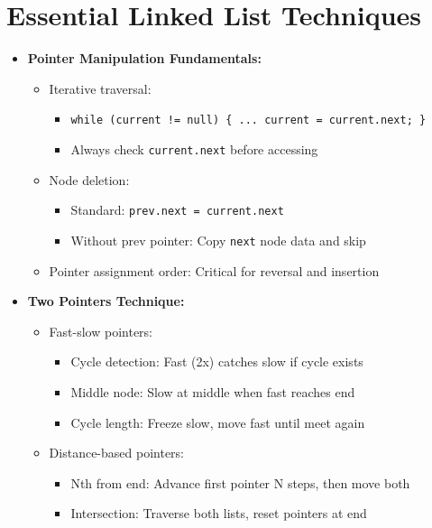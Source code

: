 \documentclass[a4paper,10pt]{book}
\begin{document}
\chapter{Essential Linked List Techniques }
\label{sec:linked}
\begin{itemize}
    \item \textbf{Pointer Manipulation Fundamentals:}
    \begin{itemize}
        \item Iterative traversal: 
        \begin{itemize}
            \item \texttt{while (current != null) \{ ... current = current.next; \}}
            \item Always check \texttt{current.next} before accessing
        \end{itemize}
        \item Node deletion: 
        \begin{itemize}
            \item Standard: \texttt{prev.next = current.next}
            \item Without prev pointer: Copy \texttt{next} node data and skip
        \end{itemize}
        \item Pointer assignment order: Critical for reversal and insertion
    \end{itemize}
    
    \item \textbf{Two Pointers Technique:}
    \begin{itemize}
        \item Fast-slow pointers:
        \begin{itemize}
            \item Cycle detection: Fast (2x) catches slow if cycle exists
            \item Middle node: Slow at middle when fast reaches end
            \item Cycle length: Freeze slow, move fast until meet again
        \end{itemize}
        \item Distance-based pointers:
        \begin{itemize}
            \item Nth from end: Advance first pointer N steps, then move both
            \item Intersection: Traverse both lists, reset pointers at end
        \end{itemize}
    \end{itemize}
    

\end{itemize}
\end{document}
